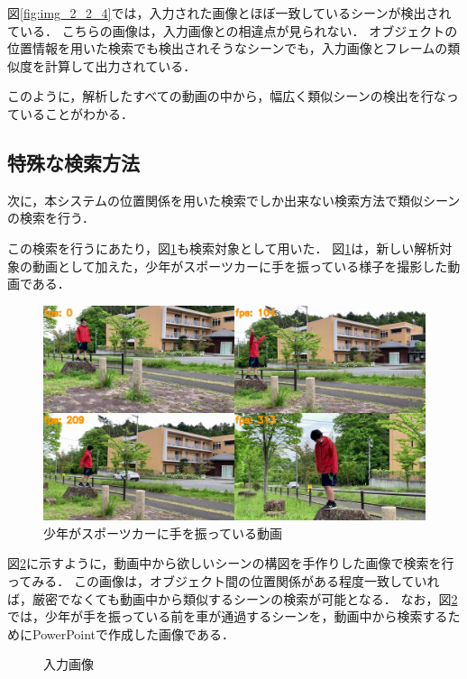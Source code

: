 \documentclass[a4j,12pt,dvipdfmx]{jreport}
\begin{document}
図\ref{fig:img_2_2_4}では，入力された画像とほぼ一致しているシーンが検出されている．
こちらの画像は，入力画像との相違点が見られない．
オブジェクトの位置情報を用いた検索でも検出されそうなシーンでも，入力画像とフレームの類似度を計算して出力されている．

このように，解析したすべての動画の中から，幅広く類似シーンの検出を行なっていることがわかる．

\subsection{特殊な検索方法}
次に，本システムの位置関係を用いた検索でしか出来ない検索方法で類似シーンの検索を行う．

この検索を行うにあたり，図\ref{fig:movie6}も検索対象として用いた．
図\ref{fig:movie6}は，新しい解析対象の動画として加えた，少年がスポーツカーに手を振っている様子を撮影した動画である．
\begin{figure}[b]
  \centering
  \includegraphics[width=13cm]{image/6_result.jpg}
  \caption{少年がスポーツカーに手を振っている動画}
  \label{fig:movie6}
\end{figure}

図\ref{fig:img_2_3}に示すように，動画中から欲しいシーンの構図を手作りした画像で検索を行ってみる．
この画像は，オブジェクト間の位置関係がある程度一致していれば，厳密でなくても動画中から類似するシーンの検索が可能となる．
なお，図\ref{fig:img_2_3}では，少年が手を振っている前を車が通過するシーンを，動画中から検索するためにPowerPointで作成した画像である．
\begin{figure}[t]
  \centering
  \caption{入力画像}
  \label{fig:img_2_3}
\end{figure}
\end{document}
